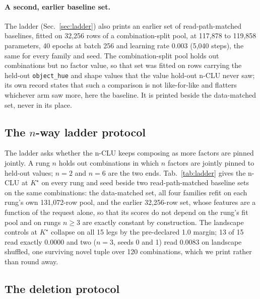 \documentclass{article} %
\newcommand{\Kstar}{\ensuremath{K^{\star}}}
\begin{document}
\paragraph{A second, earlier baseline set.} The ladder (Sec.~\ref{sec:ladder}) also prints an earlier set
of read-path-matched baselines, fitted on 32,256 rows of a combination-split pool, at 117,878 to %
119,858 parameters, 40 epochs at batch 256 and learning rate 0.003 (5,040 steps), the same for %
every family and seed. %
The combination-split pool holds out combinations but no factor value, so that set was fitted on
rows carrying the held-out \texttt{object\_hue} and shape values that the value hold-out n-CLU never
saw; its own record states that such a comparison is not like-for-like and flatters whichever arm
saw more, here the baseline. It is printed beside the data-matched set, never in its place.

\subsection{The $n$-way ladder protocol}

The ladder asks whether the n-CLU keeps composing as more factors are pinned jointly. A rung
$n$ holds out combinations in which $n$ factors are jointly pinned to held-out values; $n=2$ and
$n=6$ are the two ends. Tab.~\ref{tab:ladder} gives the n-CLU at $\Kstar$ on every rung and
seed beside two read-path-matched baseline sets on the same combinations: the data-matched set, all four
families refit on each rung's own 131,072-row pool, and the earlier 32,256-row set, whose features %
are a function of the request alone, so that its scores do not depend on the rung's fit pool and on
rungs $n\ge3$ are exactly constant by construction. %
The landscape controls at $\Kstar$ collapse on all 15 legs by the pre-declared 1.0 margin;
13 of 15 read exactly 0.0000 and two ($n=3$, seeds 0 and 1) read 0.0083 on
landscape shuffled, one surviving novel tuple over 120 combinations, which we print
rather than round away. %

\subsection{The deletion protocol}
\end{document}
